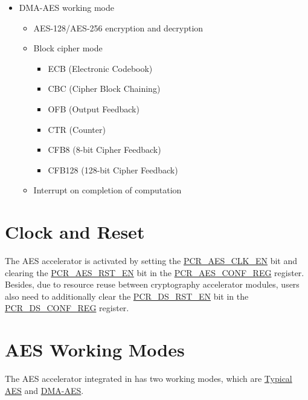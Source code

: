 \documentclass[main\_\_EN.tex]{subfiles}
\begin{document}
    \begin{itemize}
    \item DMA-AES working mode
        \begin{itemize}
            \item AES-128/AES-256 encryption and decryption
            \item Block cipher mode
                \begin{itemize}
                    \item ECB (Electronic Codebook)
                    \item CBC (Cipher Block Chaining)
                    \item OFB (Output Feedback)
                    \item CTR (Counter)
                    \item CFB8 (8-bit Cipher Feedback)
                    \item CFB128 (128-bit Cipher Feedback)
                \end{itemize}
            \item Interrupt on completion of computation
        \end{itemize}
    \end{itemize}

\section{Clock and Reset}

The AES accelerator is activated by setting the \hyperref[fielddesc:PCRAESCLKEN]{PCR\_AES\_CLK\_EN} bit and clearing the \hyperref[fielddesc:PCRAESRSTEN]{PCR\_AES\_RST\_EN} bit in the \hyperref[regdesc:PCRAESCONFREG]{PCR\_AES\_CONF\_REG} register. Besides, due to resource reuse between cryptography accelerator modules, users also need to additionally clear the \hyperref[fielddesc:PCRDSRSTEN]{PCR\_DS\_RST\_EN} bit in the \hyperref[regdesc:PCRDSCONFREG]{PCR\_DS\_CONF\_REG} register.



\section{AES Working Modes}

The AES accelerator integrated in \chipname{} has two working modes, which are \hyperref[sec:aes-typical-modes]{Typical AES} and \hyperref[sec:aes-dma-aes]{DMA-AES}.
\end{document}
